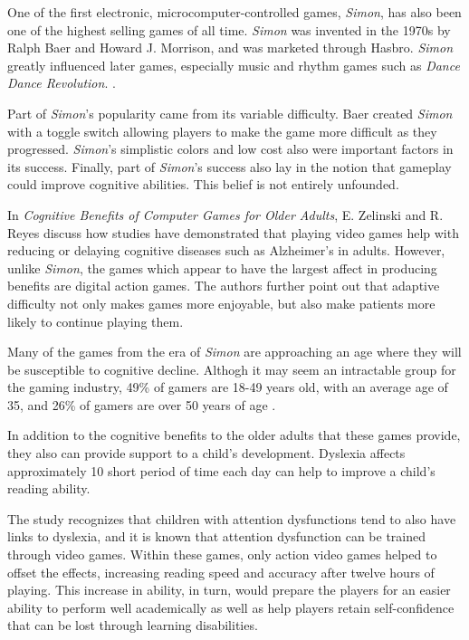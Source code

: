 One of the first electronic, microcomputer-controlled games, \textit{Simon},
has also been one of the highest selling games of all time.  \textit{Simon}
was invented in the 1970s by Ralph Baer and Howard J. Morrison, and
was marketed through Hasbro.  \textit{Simon} greatly influenced later games,
especially music and rhythm games such as \textit{Dance Dance Revolution}.
\citep{austin2016}.

Part of \textit{Simon}'s popularity came from its variable difficulty.  Baer
created \textit{Simon} with a toggle switch allowing players to make the game
more difficult as they progressed.  \textit{Simon}'s simplistic colors and low
cost also were important factors in its success.  Finally, part of
\textit{Simon}'s success also lay in the notion that gameplay could improve
cognitive abilities.  This belief is not entirely unfounded.

In \textit{Cognitive Benefits of Computer Games for Older Adults},
E. Zelinski and R. Reyes discuss how studies have demonstrated that playing video
games help with reducing or delaying cognitive diseases such as
Alzheimer’s in adults.  However, unlike \textit{Simon}, the games which appear
to have the largest affect in producing benefits are digital action games.
The authors further point out that adaptive difficulty not only makes
games more enjoyable, but also make patients more likely to continue
playing them.

Many of the games from the era of \textit{Simon} are approaching an age
where they will be susceptible to cognitive decline.  Althogh it
may seem an intractable group for the gaming industry, 49\% of gamers
are 18-49 years old, with an average age of 35, and 26\% of gamers are
over 50 years of age \citep{zelinski2009}.

In addition to the cognitive benefits to the older adults that these games
provide, they also can provide support to a child's development. Dyslexia 
affects approximately 10%
short period of time each day can help to improve a child's reading ability.

The study recognizes that children with attention dysfunctions tend to also
have links to dyslexia, and it is known that attention dysfunction can be
trained through video games. Within these games, only action video games helped
to offset the effects, increasing reading speed and accuracy after twelve hours
of playing. This increase in ability, in turn, would prepare the players for an
easier ability to perform well academically as well as help players retain
self-confidence that can be lost through learning disabilities.
\citep{franceschini2013}
